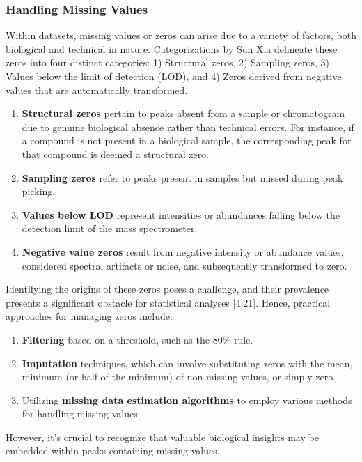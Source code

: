 \documentclass[ENG, BIB]{TFUOC}%
\begin{document}
\subsubsection{Handling Missing Values}
Within datasets, missing values or zeros can arise due to a variety of factors, both biological and technical in nature. Categorizations by Sun Xia delineate these zeros into four distinct categories: 1) Structural zeros, 2) Sampling zeros, 3) Values below the limit of detection (LOD), and 4) Zeros derived from negative values that are automatically transformed.
\begin{enumerate}
    \item \textbf{Structural zeros} pertain to peaks absent from a sample or chromatogram due to genuine biological absence rather than technical errors. For instance, if a compound is not present in a biological sample, the corresponding peak for that compound is deemed a structural zero.
    \item \textbf{Sampling zeros} refer to peaks present in samples but missed during peak picking.
    \item \textbf{Values below LOD} represent intensities or abundances falling below the detection limit of the mass spectrometer.
    \item \textbf{Negative value zeros} result from negative intensity or abundance values,
    considered spectral artifacts or noise, and subsequently transformed to zero.
\end{enumerate}

Identifying the origins of these zeros poses a challenge, and their prevalence presents a significant obstacle for statistical analyses [4,21]. Hence, practical approaches for managing zeros include:
\begin{enumerate}
    \item \textbf{Filtering} based on a threshold, such as the 80\% rule.
    \item \textbf{Imputation} techniques, which can involve substituting zeros with the mean, minimum (or half of the minimum) of non-missing values, or simply zero.
    \item Utilizing \textbf{missing data estimation algorithms} to employ various methods for handling missing values.
\end{enumerate}

However, it's crucial to recognize that valuable biological insights may be embedded within peaks containing missing values.

\end{document}
